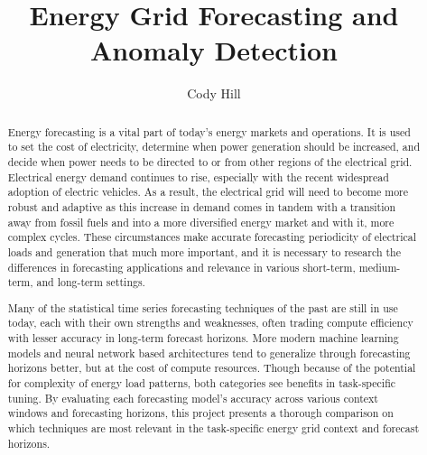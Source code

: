 \documentclass[sigconf]{acmart}
\begin{document}
\title{Energy Grid Forecasting and Anomaly Detection}


\author{Cody Hill}


\renewcommand{\shortauthors}{C. Hill}

\begin{abstract}
Energy forecasting is a vital part of today's energy markets and operations. It is used to set the cost of electricity, determine when power generation should be increased, and decide when power needs to be directed to or from other regions of the electrical grid. Electrical energy demand continues to rise, especially with the recent widespread adoption of electric vehicles. As a result, the electrical grid will need to become more robust and adaptive as this increase in demand comes in tandem with a transition away from fossil fuels and into a more diversified energy market  and with it, more complex cycles. These circumstances make accurate forecasting periodicity of electrical loads and generation that much more important, and it is necessary to research the differences in forecasting applications and relevance in various short-term, medium-term, and long-term settings.

Many of the statistical time series forecasting techniques of the past are still in use today, each with their own strengths and weaknesses, often trading compute efficiency with lesser accuracy in long-term forecast horizons. More modern machine learning models and neural network based architectures tend to generalize through forecasting horizons better, but at the cost of compute resources. Though because of the potential for complexity of energy load patterns, both categories see benefits in task-specific tuning. By evaluating each forecasting model's accuracy across various context windows and forecasting horizons, this project presents a thorough comparison on which techniques are most relevant in the task-specific energy grid context and forecast horizons.
\end{abstract}
\end{document}
